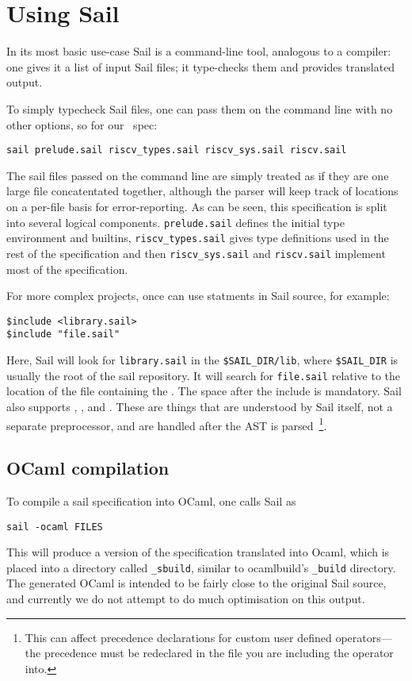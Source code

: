 \section{Using Sail}
\label{sec:usage}

In its most basic use-case Sail is a command-line tool, analogous to
a compiler: one gives it a list of input Sail files; it type-checks
them and provides translated output.

To simply typecheck Sail files, one can pass them on the command line
with no other options, so for our \riscv\ spec:
\begin{verbatim}
sail prelude.sail riscv_types.sail riscv_sys.sail riscv.sail
\end{verbatim}
The sail files passed on the command line are simply treated as if
they are one large file concatentated together, although the parser
will keep track of locations on a per-file basis for
error-reporting. As can be seen, this specification is split into
several logical components. \verb+prelude.sail+ defines the initial
type environment and builtins, \verb+riscv_types.sail+ gives type
definitions used in the rest of the specification and then
\verb+riscv_sys.sail+ and \verb+riscv.sail+ implement most of the
specification.

For more complex projects, once can use  statments in
Sail source, for example: 
\begin{lstlisting}
$include <library.sail>
$include "file.sail"
\end{lstlisting}

Here, Sail will look for \verb+library.sail+ in the
\verb+$SAIL_DIR/lib+, where \verb+$SAIL_DIR+ is usually the root of
the sail repository. It will search for \verb+file.sail+ relative to
the location of the file containing the . The space after
the include is mandatory. Sail also supports ,
, and . These are things that are understood by
Sail itself, not a separate preprocessor, and are handled after the
AST is parsed~\footnote{This can affect precedence declarations for custom user defined operators---the precedence must be redeclared in the file you are including the operator into.}.

\subsection{OCaml compilation}

To compile a sail specification into OCaml, one calls Sail as
\begin{verbatim}
sail -ocaml FILES
\end{verbatim}
This will produce a version of the specification translated into
Ocaml, which is placed into a directory called \verb+_sbuild+, similar
to ocamlbuild's \verb+_build+ directory. The generated OCaml is
intended to be fairly close to the original Sail source, and currently
we do not attempt to do much optimisation on this output.

